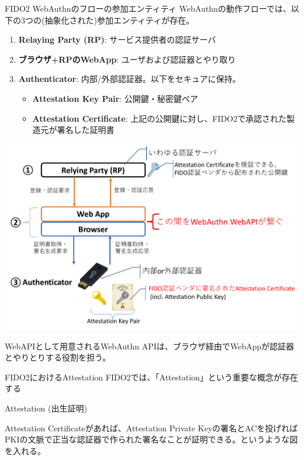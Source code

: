 \documentclass[12pt,dvipdfmx,uplatex]{beamer}
\begin{document}
\begin{frame}{FIDO2 WebAuthnのフローの参加エンティティ}
WebAuthnの動作フローでは、以下の3つの(抽象化された)参加エンティティが存在。
\begin{enumerate}
 \item \textbf{Relaying Party (RP)}: サービス提供者の認証サーバ
 \item \textbf{ブラウザ+RPのWebApp}: ユーザおよび認証器とやり取り
 \item \textbf{Authenticator}: 内部/外部認証器。以下をセキュアに保持。
\begin{itemize}
\item \textbf{\alert{Attestation Key Pair}}: 公開鍵・秘密鍵ペア
\item \textbf{\alert{Attestation Certificate}}: 上記の公開鍵に対し、FIDO2で承認された製造元が署名した証明書
\end{itemize}
\end{enumerate}
\end{frame}
\begin{frame}
\begin{center}
\includegraphics[width=0.9\linewidth]{Figs/webauthn-entities.pdf}
\end{center}
WebAPIとして用意されるWebAuthn APIは、ブラウザ経由でWebAppが認証器とやりとりする役割を担う。
\end{frame}

\begin{frame}{FIDO2におけるAttestation}
FIDO2では、「Attestation」という重要な概念が存在する
\begin{block}{\small Attestation (出生証明)}
\end{block}
Attestation Certificateがあれば、Attestation Private Keyの署名とACを投げればPKIの文脈で正当な認証器で作られた署名なことが証明できる。というような図を入れる。
\end{frame}
\end{document}
